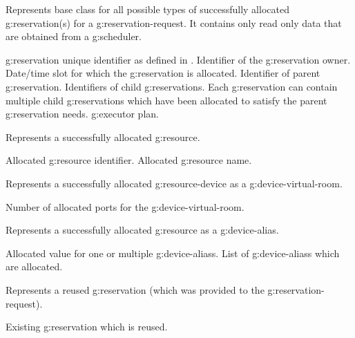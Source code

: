 \begin{Api}
Represents base class for all possible types of successfully allocated \gls{g:reservation}(s) for a \gls{g:reservation-request}. It contains only read only data that are obtained from a \gls{g:scheduler}.
\begin{ApiClassAttributes}
 \Gls{g:reservation} unique identifier as defined in .
 Identifier of the \gls{g:reservation} owner.
 Date/time slot for which the \gls{g:reservation} is allocated.
 Identifier of parent \gls{g:reservation}.
 Identifiers of child \glspl{g:reservation}. Each \gls{g:reservation} can contain multiple child \glspl{g:reservation} which have been allocated to satisfy the parent \gls{g:reservation} needs.
 \Gls{g:executor} plan.
\end{ApiClassAttributes}

Represents a successfully allocated \gls{g:resource}.
\begin{ApiClassAttributes}
 Allocated \gls{g:resource} identifier.
 Allocated \gls{g:resource} name. 
\end{ApiClassAttributes}

Represents a successfully allocated \gls{g:resource-device} as a \gls{g:device-virtual-room}.
\begin{ApiClassAttributes}
 Number of allocated ports for the \gls{g:device-virtual-room}.
\end{ApiClassAttributes}

Represents a successfully allocated \gls{g:resource} as a \gls{g:device-alias}.
\begin{ApiClassAttributes}
 Allocated value for one or multiple \glspl{g:device-alias}.
 List of \glspl{g:device-alias} which are allocated.
\end{ApiClassAttributes}

Represents a reused \gls{g:reservation} (which was provided to the \gls{g:reservation-request}).
\begin{ApiClassAttributes}
 Existing \gls{g:reservation} which is reused.
\end{ApiClassAttributes}


\end{Api}

